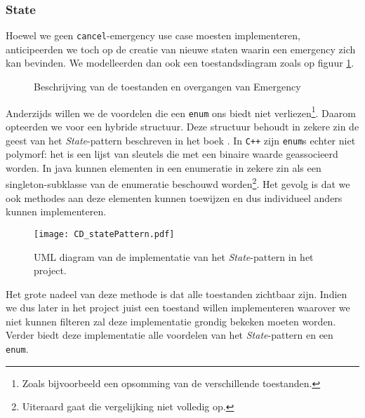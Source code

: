 \subsubsection{State}
Hoewel we geen \verb+cancel+-emergency use case moesten implementeren, anticipeerden we toch op de creatie van nieuwe staten waarin een emergency zich kan bevinden. We modelleerden dan ook een toestandsdiagram zoals op figuur \ref{fig:stateDiagramEmergency}.
\begin{figure}[h!]
\centering
{}
\caption{Beschrijving van de toestanden en overgangen van Emergency}
\label{fig:stateDiagramEmergency}
\end{figure}
Anderzijds willen we de voordelen die een \verb+enum+ ons biedt niet verliezen\footnote{Zoals bijvoorbeeld een opsomming van de verschillende toestanden.}. Daarom opteerden we voor een hybride structuur. Deze structuur behoudt in zekere zin de geest van het \textit{State}-pattern beschreven in het boek \cite{book:designpatterns}. In \verb#C++# zijn \verb+enum+s echter niet polymorf: het is een lijst van sleutels die met een binaire waarde geassocieerd worden. In java kunnen elementen in een enumeratie in zekere zin als een singleton-subklasse van de enumeratie beschouwd worden\footnote{Uiteraard gaat die vergelijking niet volledig op.}. Het gevolg is dat we ook methodes aan deze elementen kunnen toewijzen en dus individueel anders kunnen implementeren.
\begin{figure}[h!]
\texttt{[image: CD\_statePattern.pdf]}
\caption{UML diagram van de implementatie van het \textit{State}-pattern in het project.}
\label{fig:statePattern}
\end{figure}
Het grote nadeel van deze methode is dat alle toestanden zichtbaar zijn. Indien we dus later in het project juist een toestand willen implementeren waarover we niet kunnen filteren zal deze implementatie grondig bekeken moeten worden. Verder biedt deze implementatie alle voordelen van het \textit{State}-pattern en een \verb+enum+.
